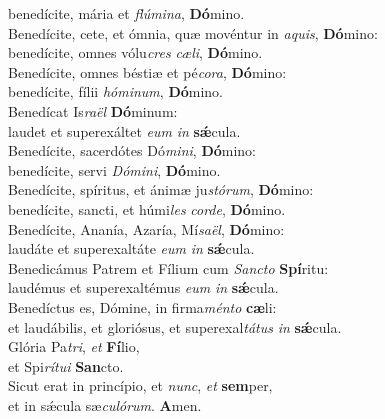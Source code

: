 \evenverse benedícite, mária et \textit{flú}\textit{mi}\textit{na}, \textbf{Dó}mino.\\
\oddverse Benedícite, cete, et ómnia, quæ movéntur in \textit{a}\textit{quis}, \textbf{Dó}mino:~\*\\
\oddverse benedícite, omnes vólu\textit{cres} \textit{cæ}\textit{li}, \textbf{Dó}mino.\\
\evenverse Benedícite, omnes béstiæ et pé\textit{co}\textit{ra}, \textbf{Dó}mino:~\*\\
\evenverse benedícite, fílii \textit{hó}\textit{mi}\textit{num}, \textbf{Dó}mino.\\
\oddverse Benedícat Is\textit{ra}\textit{ël} \textbf{Dó}minum:~\*\\
\oddverse laudet et superexáltet \textit{e}\textit{um} \textit{in} \textbf{sǽ}cula.\\
\evenverse Benedícite, sacerdótes Dó\textit{mi}\textit{ni}, \textbf{Dó}mino:~\*\\
\evenverse benedícite, servi \textit{Dó}\textit{mi}\textit{ni}, \textbf{Dó}mino.\\
\oddverse Benedícite, spíritus, et ánimæ ju\textit{stó}\textit{rum}, \textbf{Dó}mino:~\*\\
\oddverse benedícite, sancti, et húmi\textit{les} \textit{cor}\textit{de}, \textbf{Dó}mino.\\
\evenverse Benedícite, Ananía, Azaría, Mí\textit{sa}\textit{ël}, \textbf{Dó}mino:~\*\\
\evenverse laudáte et superexaltáte \textit{e}\textit{um} \textit{in} \textbf{sǽ}cula.\\
\oddverse Benedicámus Patrem et Fílium cum \textit{San}\textit{cto} \textbf{Spí}ritu:~\*\\
\oddverse laudémus et superexaltémus \textit{e}\textit{um} \textit{in} \textbf{sǽ}cula.\\
\evenverse Benedíctus es, Dómine, in firma\textit{mén}\textit{to} \textbf{cæ}li:~\*\\
\evenverse et laudábilis, et gloriósus, et superexal\textit{tá}\textit{tus} \textit{in} \textbf{sǽ}cula.\\
\oddverse Glória Pa\textit{tri}, \textit{et} \textbf{Fí}lio,~\*\\
\oddverse et Spi\textit{rí}\textit{tu}\textit{i} \textbf{San}cto.\\
\evenverse Sicut erat in princípio, et \textit{nunc}, \textit{et} \textbf{sem}per,~\*\\
\evenverse et in sǽcula sæ\textit{cu}\textit{ló}\textit{rum}. \textbf{A}men.\\
